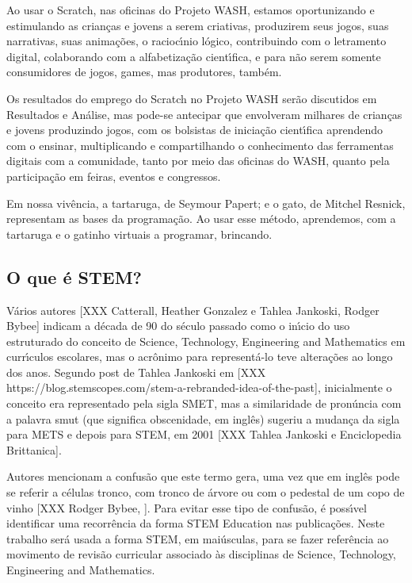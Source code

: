 \documentclass[
12pt,		%
openright,	%
twoside,  %
a4paper,			%
chapter=TITLE,		%
english,			%
french,				%
spanish,			%
brazil				%
]{USPSC-classe/USPSC}
\begin{document}
Ao usar o Scratch, nas oficinas do Projeto WASH, estamos oportunizando e estimulando \textquotedbl as crian\c{c}as e jovens a serem criativas, produzirem seus jogos, suas narrativas, suas anima\c{c}\~oes, o racioc\'{\i}nio l\'ogico, contribuindo com o letramento digital, colaborando com a alfabetiza\c{c}\~ao cient\'{\i}fica, e para n\~ao serem somente consumidores de jogos, games, mas produtores, tamb\'em\textquotedbl .


Os resultados do emprego do Scratch no Projeto WASH ser\~ao discutidos em Resultados e An\'alise, mas pode-se antecipar que envolveram milhares de crian\c{c}as e jovens produzindo jogos, com os bolsistas de inicia\c{c}\~ao cient\'{\i}fica aprendendo com o ensinar, multiplicando e compartilhando o conhecimento das ferramentas digitais  com a comunidade, tanto por meio das oficinas do WASH, quanto pela participa\c{c}\~ao em feiras, eventos e congressos.


Em nossa viv\^encia, a tartaruga, de Seymour Papert; e o gato, de Mitchel Resnick,  representam as bases da  programa\c{c}\~ao. Ao usar esse m\'etodo, aprendemos, com a tartaruga e o gatinho virtuais a  programar,  brincando.


\subsection[O que \'e STEM?]{O que \'e STEM?}\label{O que \'e STEM?}
V\'arios autores [XXX Catterall, Heather Gonzalez e  Tahlea Jankoski, Rodger Bybee] indicam a d\'ecada de 90 do s\'eculo passado como o in\'{\i}cio do uso estruturado do conceito de Science, Technology, Engineering and Mathematics em curr\'{\i}culos escolares, mas o acr\^onimo para represent\'a-lo teve altera\c{c}\~oes ao longo dos anos. Segundo post de Tahlea Jankoski em [XXX https://blog.stemscopes.com/stem-a-rebranded-idea-of-the-past], inicialmente o conceito era representado pela sigla SMET, mas a similaridade de pron\'uncia com a palavra \textquotedbl smut (que significa obscenidade, em ingl\^es) sugeriu a mudan\c{c}a da sigla para METS e depois para STEM, em 2001 [XXX Tahlea Jankoski e Enciclopedia Brittanica]. 


Autores mencionam a confus\~ao que este termo gera, uma vez que em ingl\^es pode se referir a c\'elulas tronco, com tronco de \'arvore ou com o pedestal de um copo de vinho [XXX Rodger Bybee, ]. Para evitar esse tipo de confus\~ao, \'e poss\'{\i}vel identificar uma recorr\^encia da forma \textquotedbl STEM Education nas publica\c{c}\~oes. Neste trabalho ser\'a usada a forma STEM, em mai\'usculas, para se fazer refer\^encia ao movimento de revis\~ao curricular associado \`as disciplinas de \textquotedbl Science, Technology, Engineering and Mathematics.  
\end{document}
